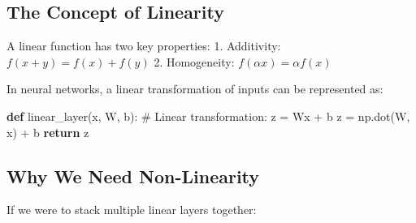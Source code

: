 \documentclass[
  letterpaper,
  DIV=11,
  numbers=noendperiod]{scrreprt}
\newenvironment{Shaded}{\begin{snugshade}}{\end{snugshade}}
\newcommand{\CommentTok}[1]{\textcolor[rgb]{0.37,0.37,0.37}{#1}}
\newcommand{\ControlFlowTok}[1]{\textcolor[rgb]{0.00,0.23,0.31}{\textbf{#1}}}
\newcommand{\KeywordTok}[1]{\textcolor[rgb]{0.00,0.23,0.31}{\textbf{#1}}}
\newcommand{\NormalTok}[1]{\textcolor[rgb]{0.00,0.23,0.31}{#1}}
\newcommand{\OperatorTok}[1]{\textcolor[rgb]{0.37,0.37,0.37}{#1}}
\begin{document}
\subsection{The Concept of Linearity}\label{the-concept-of-linearity}

A linear function has two key properties: 1. Additivity:
\(f(x + y) = f(x) + f(y)\) 2. Homogeneity: \(f(αx) = αf(x)\)

In neural networks, a linear transformation of inputs can be represented
as:

\begin{Shaded}
\begin{Highlighting}[]
\KeywordTok{def}\NormalTok{ linear\_layer(x, W, b):}
    \CommentTok{\# Linear transformation: z = Wx + b}
\NormalTok{    z }\OperatorTok{=}\NormalTok{ np.dot(W, x) }\OperatorTok{+}\NormalTok{ b}
    \ControlFlowTok{return}\NormalTok{ z}
\end{Highlighting}
\end{Shaded}

\subsection{Why We Need Non-Linearity}\label{why-we-need-non-linearity}

If we were to stack multiple linear layers together:
\end{document}
